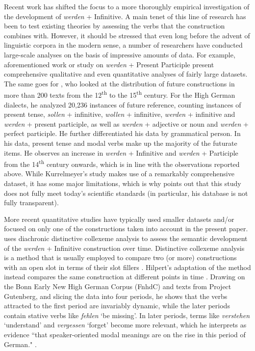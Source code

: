 \documentclass[output=paper,colorlinks,citecolor=brown]{langscibook}
\begin{document}
Recent work has shifted the focus to a more thoroughly empirical investigation of the development of \textit{werden} + Infinitive. A main tenet of this line of research has been to test existing theories by assessing the verbs that the construction combines with. However, it should be stressed that even long before the advent of linguistic corpora in the modern sense, a number of researchers have conducted large-scale analyses on the basis of impressive amounts of data. For example,  aforementioned work or  study on \textit{werden} + Present Participle present comprehensive qualitative and even quantitative analyses of fairly large datasets. The same goes for \citet[]{kurrelmeyer1904}, who looked at the distribution of future constructions in more than 200 texts from the 12\textsuperscript{th} to the 15\textsuperscript{th} century. For the High German dialects, he analyzed 20,236 instances of future reference, counting instances of present tense, \textit{sollen} + infinitive, \textit{wollen} + infinitive, \textit{werden} + infinitive and \textit{werden} + present participle, as well as \textit{werden} + adjective or noun and \textit{werden} + perfect participle. He further differentiated his data by grammatical person. In his data, present tense and modal verbs make up the majority of the futurate items. He observes an increase in \textit{werden} + Infinitive and \textit{werden} + Participle from the 14\textsuperscript{th} century onwards, which is in line with the observations reported above. While Kurrelmeyer's study makes use of a remarkably comprehensive dataset, it has some major limitations, which is why \citet[16]{Luther2013}  points out that this study does not fully meet today's scientific standards (in particular, his database is not fully transparent). 

More recent quantitative studies have typically used smaller datasets and/or focused on only one of the constructions taken into account in the present paper.  \citet[147--153]{Hilpert2008}{} uses diachronic distinctive collexeme analysis to assess the semantic development of the \textit{werden} + Infinitive construction over time. Distinctive collexeme analysis is a method that is usually employed to compare two (or more) constructions with an open slot in terms of their slot fillers \citep[][]{griesExtendingCollostructionalAnalysis2004}{}{}. Hilpert's adaptation of the method instead compares the same construction at different points in time \citep[][]{hilpertDistinctiveCollexemeAnalysis2006}{}{}. Drawing on the Bonn Early New High German Corpus (FnhdC) and texts from Project Gutenberg, and slicing the data into four periods, he shows that the verbs attracted to the first period are invariably dynamic, while the later periods contain stative verbs like \textit{fehlen} `be missing'. In later periods, terms like \textit{verstehen} `understand' and \textit{vergessen} `forget' become more relevant, which he interprets as evidence  ``that speaker-oriented modal meanings are on the rise in this period of German." \citep[][152]{Hilpert2008}{}{}. 
\end{document}
